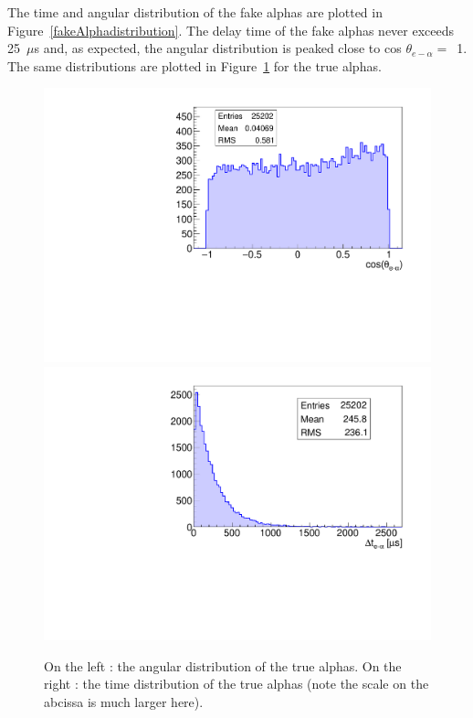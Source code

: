 \documentclass[main.tex]{subfiles}
\begin{document}
\noindent The time and angular distribution of the fake alphas are plotted in Figure~\ref{fakeAlphadistribution}. The delay time of the fake alphas never exceeds 25~$\mu$s and, as expected, the angular distribution is peaked close to cos $\theta_{e-\alpha} =$~1. The same distributions are plotted in Figure~\ref{trueAlphadistribution} for the true alphas.


\begin{figure}[h!]
\begin{center}
\includegraphics[scale=0.34]{pictures/Chap5/true_alpha_angle_distribution.pdf}
\includegraphics[scale=0.34]{pictures/Chap5/true_alpha_delayed_time.pdf}
\caption{On the left : the angular distribution of the true alphas. On the right : the time distribution of the true alphas (note the scale on the abcissa is much larger here).}
\label{trueAlphadistribution}
\end{center}
\end{figure}
\end{document}
